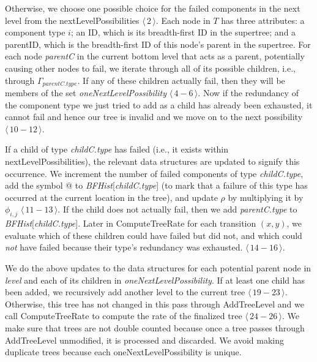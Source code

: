 \documentclass[12pt]{article}
\newcommand{\varName}[1]{\textrm{\it#1}}
\newcommand{\citeLine}[1]{$\langle \, #1 \, \rangle$}
\newcommand{\citeBlock}[2]{$\langle \, #1 - #2 \, \rangle$}
\begin{document}
Otherwise, we choose one possible choice for the failed components in the next level from the nextLevelPossibilities \citeLine{2}. Each node in $T$ has three attributes: a component type $i$; an ID, which is its breadth-first ID in the supertree; and a parentID, which is the breadth-first ID of this node's parent in the supertree. For each node \varName{parentC} in the current bottom level that acts as a parent, potentially causing other nodes to fail, we iterate through all of its possible children, i.e., through $\Gamma_{parentC.type}$. If any of these children actually fail, then they will be members of the set \varName{oneNextLevelPossibility} \citeBlock{4}{6}. Now if the redundancy of the component type we just tried to add as a child has already been exhausted, it cannot fail and hence our tree is invalid and we move on to the next possibility \citeBlock{10}{12}.

If a child of type \varName{childC.type} has failed (i.e., it exists within nextLevelPossibilities), the relevant data structures are updated to signify this occurrence. We increment the number of failed components of type \varName{childC.type}, add the symbol @ to \varName{BFHist}[\varName{childC.type}] (to mark that a failure of this type has occurred at the current location in the tree), and update $\rho$ by multiplying it by $\phi_{i, j}$ \citeBlock{11}{13}. If the child does not actually fail, then we add \varName{parentC.type} to \varName{BFHist}[\varName{childC.type}]. Later in ComputeTreeRate for each transition $(x, y)$, we evaluate which of these children could have failed but did not, and which could \textit{not} have failed because their type's redundancy was exhausted. \citeBlock{14}{16}.

We do the above updates to the data structures for each potential parent node in \varName{level} and each of its children in \varName{oneNextLevelPossibility}. If at least one child has been added, we recursively add another level to the current tree \citeBlock{19}{23}. Otherwise, this tree has not changed in this pass through \mbox{AddTreeLevel} and we call ComputeTreeRate to compute the rate of the finalized tree \citeBlock{24}{26}. We make sure that trees are not double counted because once a tree passes through \mbox{AddTreeLevel} unmodified, it is processed and discarded. We avoid making duplicate trees because each oneNextLevelPossibility is unique.
\end{document}
